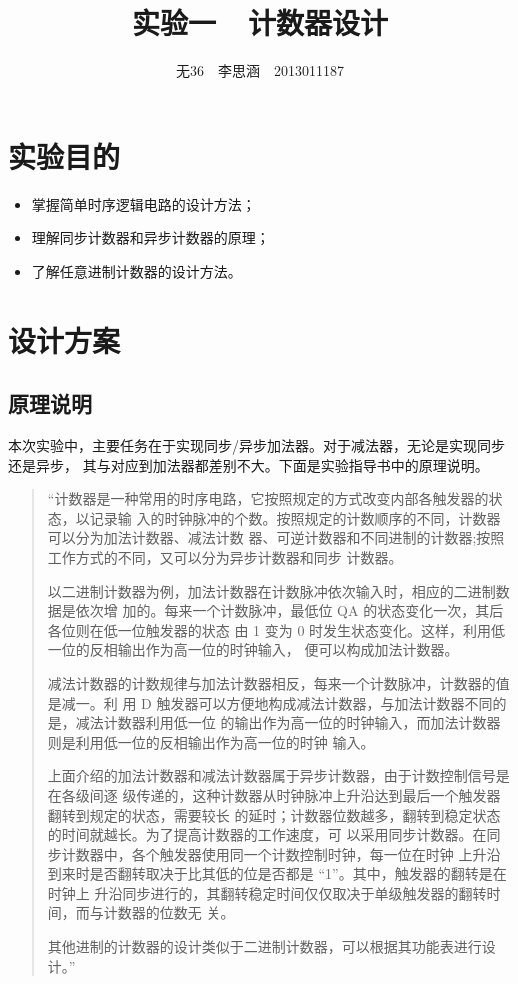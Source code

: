 \documentclass[11pt,a4paper]{article}
\begin{document}
\title{实验一\ \ 计数器设计}
\author{无36$\quad$李思涵$\quad$2013011187}
\maketitle

\section{实验目的}
\begin{itemize}
  \item 掌握简单时序逻辑电路的设计方法；
  \item 理解同步计数器和异步计数器的原理；
  \item 了解任意进制计数器的设计方法。
\end{itemize}

\section{设计方案}
\subsection{原理说明}
本次实验中，主要任务在于实现同步/异步加法器。对于减法器，无论是实现同步还是异步，
其与对应到加法器都差别不大。下面是实验指导书中的原理说明。

\begin{quotation}
“计数器是一种常用的时序电路，它按照规定的方式改变内部各触发器的状态，以记录输
入的时钟脉冲的个数。按照规定的计数顺序的不同，计数器可以分为加法计数器、减法计数 器、可逆计数器和不同进制的计数器;按照工作方式的不同，又可以分为异步计数器和同步
计数器。

以二进制计数器为例，加法计数器在计数脉冲依次输入时，相应的二进制数据是依次增
加的。每来一个计数脉冲，最低位 QA 的状态变化一次，其后各位则在低一位触发器的状态
由 1 变为 0 时发生状态变化。这样，利用低一位的反相输出作为高一位的时钟输入，
便可以构成加法计数器。

减法计数器的计数规律与加法计数器相反，每来一个计数脉冲，计数器的值是减一。利
用 D 触发器可以方便地构成减法计数器，与加法计数器不同的是，减法计数器利用低一位
的输出作为高一位的时钟输入，而加法计数器则是利用低一位的反相输出作为高一位的时钟
输入。

上面介绍的加法计数器和减法计数器属于异步计数器，由于计数控制信号是在各级间逐
级传递的，这种计数器从时钟脉冲上升沿达到最后一个触发器翻转到规定的状态，需要较长
的延时；计数器位数越多，翻转到稳定状态的时间就越长。为了提高计数器的工作速度，可
以采用同步计数器。在同步计数器中，各个触发器使用同一个计数控制时钟，每一位在时钟
上升沿到来时是否翻转取决于比其低的位是否都是 “1”。其中，触发器的翻转是在时钟上
升沿同步进行的，其翻转稳定时间仅仅取决于单级触发器的翻转时间，而与计数器的位数无
关。

其他进制的计数器的设计类似于二进制计数器，可以根据其功能表进行设计。”
\end{quotation}
\end{document}
